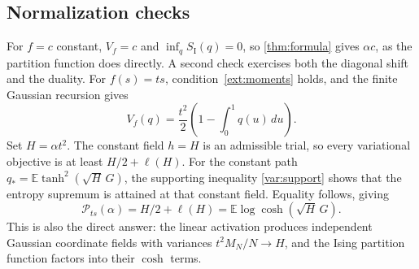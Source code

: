 \subsection{Normalization checks}

For $f=c$ constant, $V_f=c$ and $\inf_qS_{\mathrm I}(q)=0$, so
\eqref{thm:formula} gives $\alpha c$, as the partition function does
directly. A second check exercises both the diagonal shift and the duality.
For $f(s)=ts$, condition~\eqref{ext:moments} holds, and the finite Gaussian
recursion gives
\[
 V_f(q)=\frac{t^2}{2}\left(1-\int_0^1q(u)\,du\right).
\]
Set $H=\alpha t^2$. The constant field $h=H$ is an admissible trial, so
every variational objective is at least $H/2+\ell(H)$.
For the constant path $q_*=\mathbb E\tanh^2(\sqrt H\,G)$, the supporting
inequality \eqref{var:support} shows that the entropy supremum is attained
at that constant field. Equality follows, giving
\[
 \mathcal P_{ts}(\alpha)
 =H/2+\ell(H)=\mathbb E\log\cosh(\sqrt H\,G).
\]
This is also the direct answer: the linear activation produces independent
Gaussian coordinate fields with variances $t^2M_N/N\to H$, and the Ising
partition function factors into their $\cosh$ terms.
